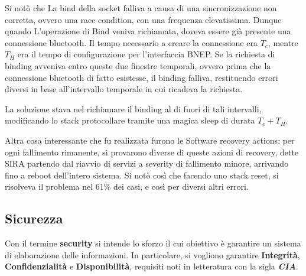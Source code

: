\documentclass{article}
\begin{document}
Si notò che La bind della socket falliva a causa di una sincronizzazione non corretta, 
ovvero una race condition, con una frequenza elevatissima. Dunque quando L’operazione di Bind
veniva richiamata, doveva essere già presente una connessione bluetooth. Il tempo necessario
a creare la connessione era $T_c$, mentre $T_H$ era il tempo di configurazione per 
l’interfaccia BNEP. Se la richiesta di binding avveniva entro queste due finestre temporali,
ovvero prima che la connessione bluetooth di fatto esistesse, il binding falliva, restituendo
errori diversi in base all’intervallo temporale in cui ricadeva la richiesta. 

La soluzione stava nel richiamare il binding al di fuori di tali intervalli, modificando lo
stack protocollare tramite una magica sleep di durata $T_c +T_H$.

Altra cosa interessante che fu realizzata furono le Software recovery actions: per ogni
fallimento rimanente, si provarono diverse di queste azioni di recovery, dette SIRA
partendo dal riavvio di servizi a severity di fallimento minore, arrivando fino a reboot
dell’intero sistema. Si notò così che facendo uno stack reset, si risolveva il problema
nel 61\% dei casi, e così per diversi altri errori.

\clearpage
\subsection{Sicurezza}
Con il termine \textbf{security} si intende lo sforzo il cui obiettivo è garantire un sistema 
di elaborazione delle informazioni. In particolare, si vogliono garantire \textbf{Integrità}, 
\textbf{Confidenzialità} e \textbf{Disponibilità}, requisiti noti in letteratura con la sigla
\textbf{\textit{CIA}}.
\end{document}

